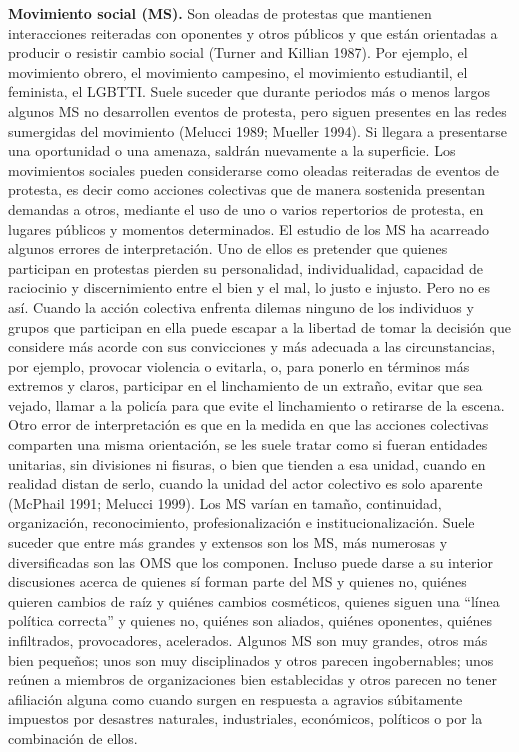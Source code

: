 \documentclass[letterpaper, 11pt]{book}
\theoremstyle{definition}
\theoremstyle{remark}
\begin{document}
{{{{{{{\textbf{Movimiento social (MS).} \small{Son oleadas de protestas que mantienen interacciones reiteradas con oponentes y otros públicos y que están orientadas a producir o resistir cambio social (Turner and Killian 1987).
Por ejemplo, el movimiento obrero, el movimiento campesino, el movimiento estudiantil, el feminista, el LGBTTI.
Suele suceder que durante periodos más o menos largos algunos MS no desarrollen eventos de protesta, pero siguen presentes en las redes sumergidas del movimiento (Melucci 1989; Mueller 1994). 
Si llegara a presentarse una oportunidad o una amenaza, saldrán nuevamente a la superficie. 
Los movimientos sociales pueden considerarse como oleadas reiteradas de eventos de protesta, es decir como acciones colectivas que de manera sostenida presentan demandas a otros, mediante el uso de uno o varios repertorios de protesta, en lugares públicos y momentos determinados. 
El estudio de los MS ha acarreado algunos errores de interpretación. 
Uno de ellos es pretender que quienes participan en protestas pierden su personalidad, individualidad, capacidad de raciocinio y discernimiento entre el bien y el mal, lo justo e injusto.
Pero no es así. 
Cuando la acción colectiva enfrenta dilemas ninguno de los individuos y grupos que participan en ella puede escapar a la libertad de tomar la decisión que considere más acorde con sus convicciones y más adecuada a las circunstancias, por ejemplo, provocar violencia o evitarla, o, para ponerlo en términos más extremos y claros, participar en el linchamiento de un extraño, evitar que sea vejado, llamar a la policía para que evite el linchamiento o retirarse de la escena.
Otro error de interpretación es que en la medida en que las acciones colectivas comparten una misma orientación, se les suele tratar como si fueran entidades unitarias, sin divisiones ni fisuras, o bien que tienden a esa unidad, cuando en realidad distan de serlo, cuando la unidad del actor colectivo es solo aparente (McPhail 1991; Melucci 1999).
Los MS varían en tamaño, continuidad, organización, reconocimiento, profesionalización e institucionalización. 
Suele suceder que entre más grandes y extensos son los MS, más numerosas y diversificadas son las OMS que los componen.
Incluso puede darse a su interior discusiones acerca de quienes sí forman parte del MS y quienes no, quiénes quieren cambios de raíz y quiénes cambios cosméticos, quienes siguen una ``línea política correcta'' y quienes no, quiénes son aliados, quiénes oponentes, quiénes infiltrados, provocadores, acelerados. 
Algunos MS son muy grandes, otros más bien pequeños; unos son muy disciplinados y otros parecen ingobernables; unos reúnen a miembros de organizaciones bien establecidas y otros parecen no tener afiliación alguna como cuando surgen en respuesta a agravios súbitamente impuestos por desastres naturales, industriales, económicos, políticos o por la combinación de ellos.
}}}}}}}}
\end{document}
